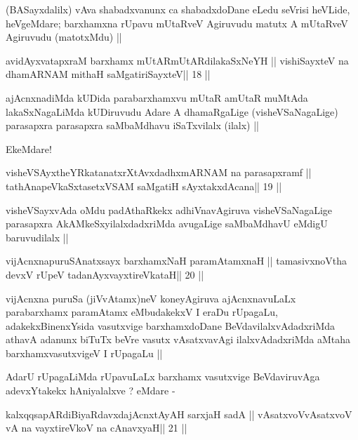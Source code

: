 \begin{artha}
(BASayxdalilx) vAva shabadxvanunx ca shabadxdoDane eLedu seVrisi
  heVLide, heVgeMdare; barxhamxna rUpavu mUtaRveV Agiruvudu matutx A
  mUtaRveV Agiruvudu (matotxMdu) ||
\end{artha}

\begin{shl}
avidAyxvatapxraM barxhamx mUtARmUtARdilakaSxNeYH ||
vishiSayxteV na dhamARNAM mithaH saMgatiriSayxteV\hfill || 18 ||
\end{shl}

\begin{artha}
ajAcnxnadiMda kUDida parabarxhamxvu mUtaR amUtaR muMtAda
lakaSxNagaLiMda kUDiruvudu Adare A dhamaRgaLige (visheVSaNagaLige)
parasapxra parasapxra saMbaMdhavu iSaTxvilalx (ilalx) || 

EkeMdare!
\end{artha}

\begin{shl}
visheVSAyxtheYRkatanatxrXtAvxdadhxmARNAM na parasapxramf ||
tathA\s napeVkaSxtasetxVSAM saMgatiH sAyxtakxdAcana\hfill || 19 ||
\end{shl}

\begin{artha}
visheVSayxvAda oMdu padAthaRkekx adhiVnavAgiruva visheVSaNagaLige
parasapxra AkAMkeSxyilalxdadxriMda avugaLige saMbaMdhavU eMdigU
baruvudilalx ||
\end{artha}

\begin{shl}
vijAcnxnapuruSAnatxsayx barxhamxNaH paramAtamxnaH ||
tamasivxnoV\s tha devxV rUpeV tadanAyxvayxtireVkataH\hfill || 20 ||
\end{shl}

\begin{artha}
vijAcnxna puruSa (jiVvAtamx)neV koneyAgiruva ajAcnxnavuLaLx
parabarxhamx paramAtamx eMbudakekxV I eraDu rUpagaLu,
adakekxBinenxYsida vasutxvige barxhamxdoDane BeVdavilalxvAdadxriMda
athavA adanunx biTuTx beVre vasutx vAsatxvavAgi ilalxvAdadxriMda
aMtaha barxhamxvasutxvigeV I rUpagaLu ||

AdarU rUpagaLiMda rUpavuLaLx barxhamx vasutxvige BeVdaviruvAga
adevxYtakekx hAniyalalxve ? eMdare -
\end{artha}

\begin{shl}
kalxqqsapARdiBiyaRdavxdajAcnxtAyAH sarxjaH sadA ||
vAsatxvoV\s vAsatxvoV vA na vayxtireVkoV na cAnavxyaH\hfill || 21 ||
\end{shl}


